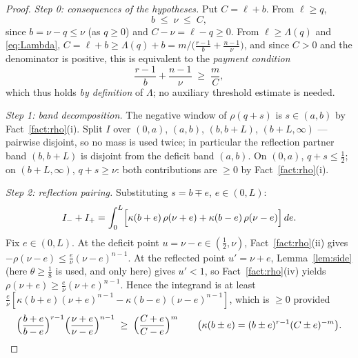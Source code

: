 \documentclass[11pt]{article}
\theoremstyle{remark}
\theoremstyle{plain}
\theoremstyle{plain}
\begin{document}
\begin{proof}
\emph{Step 0: consequences of the hypotheses.}  Put $C=\ell+b$.  From $\ell\ge q$,
\begin{equation}\label{eq:chain}
        b\;\le\;\nu\;\le\;C,
\end{equation}
since $b=\nu-q\le\nu$ (as $q\ge0$) and $C-\nu=\ell-q\ge0$.  From $\ell\ge\Lambda(q)$ and \eqref{eq:Lambda},
$C=\ell+b\ge\Lambda(q)+b=m\big/\bigl(\tfrac{r-1}{b}+\tfrac{n-1}{\nu}\bigr)$,
and since $C>0$ and the denominator is positive, this is equivalent to the \emph{payment condition}
\begin{equation}\label{eq:payment}
        \frac{r-1}{b}+\frac{n-1}{\nu}\;\ge\;\frac mC ,
\end{equation}
which thus holds \emph{by definition} of $\Lambda$; no auxiliary threshold estimate is needed.

\emph{Step 1: band decomposition.}  The negative window of $\rho(q+s)$ is $s\in(a,b)$ by Fact~\ref{fact:rho}(i).  Split $I$ over $(0,a)$, $(a,b)$, $(b,b+L)$, $(b+L,\infty)$ --- pairwise disjoint, so no mass is used twice; in particular the reflection partner band $(b,b+L)$ is disjoint from the deficit band $(a,b)$.  On $(0,a)$, $q+s\le\tfrac12$; on $(b+L,\infty)$, $q+s\ge\nu$: both contributions are $\ge0$ by Fact~\ref{fact:rho}(i).

\emph{Step 2: reflection pairing.}  Substituting $s=b\mp e$, $e\in(0,L)$:
\[
        I_-+I_+=\int_0^{L}
        \Bigl[\kappa(b+e)\,\rho(\nu+e)+\kappa(b-e)\,\rho(\nu-e)\Bigr]\,de .
\]
Fix $e\in(0,L)$.  At the deficit point $u=\nu-e\in(\tfrac12,\nu)$, Fact~\ref{fact:rho}(ii) gives $-\rho(\nu-e)\le\frac e\nu(\nu-e)^{n-1}$.  At the reflected point $u'=\nu+e$, Lemma~\ref{lem:side} (here $\theta\ge\tfrac18$ is used, and only here) gives $u'<1$, so Fact~\ref{fact:rho}(iv) yields $\rho(\nu+e)\ge\frac e\nu(\nu+e)^{n-1}$.  Hence the integrand is at least
$\frac e\nu[\kappa(b+e)(\nu+e)^{n-1}-\kappa(b-e)(\nu-e)^{n-1}]$,
which is $\ge0$ provided
\begin{equation}\label{eq:product}
        \Bigl(\frac{b+e}{b-e}\Bigr)^{r-1}
        \Bigl(\frac{\nu+e}{\nu-e}\Bigr)^{n-1}
        \;\ge\;
        \Bigl(\frac{C+e}{C-e}\Bigr)^{m}
        \qquad\bigl(\kappa(b\pm e)=(b\pm e)^{r-1}(C\pm e)^{-m}\bigr).
\end{equation}


\end{proof}
\end{document}
